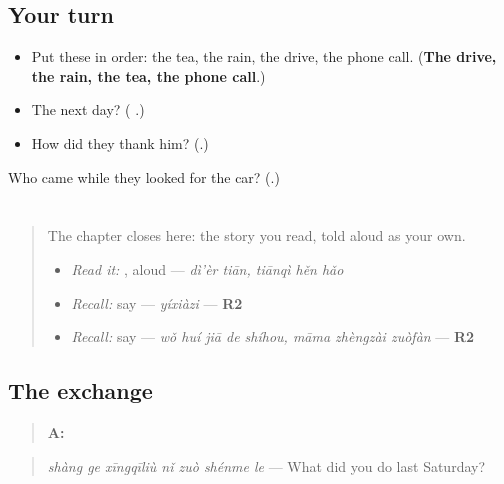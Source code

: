 \subsection*{Your turn}
\begin{itemize}
\raggedright
  \item Put these in order: the tea, the rain, the drive, the phone call. (\textbf{The drive, the rain, the tea, the phone call}.)
  \item The next day? (\textbf{ }.)
  \item How did they thank him? (\textbf{}.)
\end{itemize}

\begin{tcolorbox}[breakable,colback=teal!4,colframe=teal!35!black,title={Before you move on}]
Who came while they looked for the car? (\textbf{}.)
\end{tcolorbox}
\section[Practice]{}

\label{lesson:ZH-C279-practice}



\begin{quote}
The chapter closes here: the story you read, told aloud as your own.

\begin{itemize}
\raggedright
  \item \emph{Read it:}  , aloud — \emph{dì'èr tiān, tiānqì hěn hǎo}
  \item \emph{Recall:} say  — \emph{yíxiàzi} — \textbf{R2}
  \item \emph{Recall:} say   — \emph{wǒ huí jiā de shíhou, māma zhèngzài zuòfàn} — \textbf{R2}
\end{itemize}
\end{quote}

\subsection*{The exchange}
\begin{quote}
\textbf{A:} 
\end{quote}

\begin{quote}
\emph{shàng ge xīngqīliù nǐ zuò shénme le} — What did you do last Saturday?
\end{quote}

